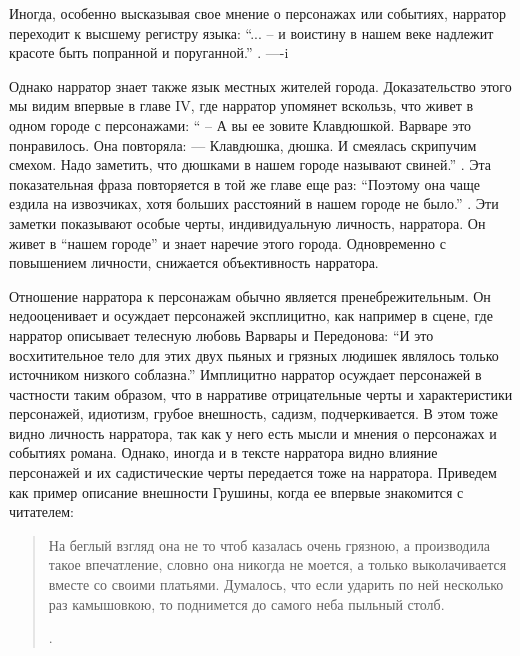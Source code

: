\documentclass[12pt,a4paper]{article}
\begin{document}
Иногда, особенно высказывая свое мнение о персонажах или событиях, нарратор переходит к высшему регистру языка: \enquote{... – и воистину в нашем веке надлежит красоте быть попранной и поруганной.} \parencite[51]{sologub2004}.
----i

Однако нарратор знает также язык местных жителей города. Доказательство этого мы видим впервые в главе IV, где нарратор упомянет вскользь, что живет в одном городе с персонажами: \enquote{ – А вы ее зовите Клавдюшкой.
Варваре это понравилось. Она повторяла:
— Клавдюшка, дюшка.
И смеялась скрипучим смехом. Надо заметить, что дюшками в 
нашем городе называют свиней.} \parencite[33]{sologub2004}. Эта показательная фраза повторяется в той же главе еще раз: \enquote{Поэтому она чаще ездила на извозчиках,
хотя больших расстояний в нашем городе не было.} \parencite[34]{sologub2004}. Эти заметки показывают особые черты, индивидуальную личность,  нарратора. Он живет в \enquote{нашем городе} и знает наречие этого города. Одновременно с повышением личности, снижается объективность нарратора.

Отношение нарратора к персонажам обычно является пренебрежительным. Он недооценивает и осуждает персонажей эксплицитно, как например в сцене, где нарратор описывает телесную любовь Варвары и Передонова: 
\enquote{И это восхитительное тело для этих двух пьяных и грязных людишек являлось только источником низкого соблазна.} \parencite[51.]{sologub2004} 
Имплицитно нарратор осуждает персонажей в частности таким образом, что в нарративе отрицательные черты и характеристики персонажей, идиотизм, грубое внешность, садизм, подчеркивается. В этом тоже видно личность нарратора, так как у него есть мысли и мнения о персонажах и событиях романа. Однако, иногда и в тексте нарратора видно влияние персонажей и их садистические черты передается тоже на нарратора. Приведем как пример описание внешности Грушины, когда ее впервые знакомится с читателем:

\begin{quote}
На беглый взгляд она не то
чтоб казалась очень грязною, а производила такое впечатление, словно
она никогда не моется, а только выколачивается вместе со своими 
платьями. Думалось, что если ударить по ней несколько раз камышовкою,
то поднимется до самого неба пыльный столб.

\parencite[33]{sologub2004}.
\end{quote}
\end{document}
